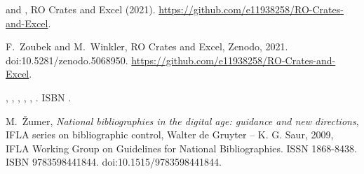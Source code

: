 \documentclass[ds,v1.1.2,openaccess]{iosart2x}%
\begin{document}
\begin{thebibliography}{}
%
\begin{botherref}
 and
,
RO Crates and Excel
(2021).
\url{https://github.com/e11938258/RO-Crates-and-Excel}.
\end{botherref}
%
\OrigBibText
F.~Zoubek and
M.~Winkler,
RO Crates and Excel,
Zenodo,
2021.
doi:10.5281/zenodo.5068950.
\url{https://github.com/e11938258/RO-Crates-and-Excel}.
\endOrigBibText
{}
\endbibitem

%
\begin{bbook}
,
,
,
,
,
.
ISBN .
\end{bbook}
%
\OrigBibText
M.~\v{Z}umer,
\textit{National bibliographies in the digital age: guidance and new
directions},
{IFLA} series on bibliographic control,
Walter de Gruyter -- K. G. Saur,
2009,
{IFLA Working Group on Guidelines for National Bibliographies}.
ISSN 1868-8438.
ISBN 9783598441844.
doi:10.1515/9783598441844.
\endOrigBibText
{}
\endbibitem

\end{thebibliography}
\end{document}
